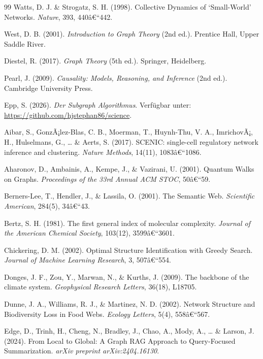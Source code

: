 ﻿\documentclass[12pt,a4paper,twoside]{article}
\theoremstyle{definition}
\theoremstyle{plain}
\theoremstyle{remark}
\begin{document}
\begin{thebibliography}{99}
  Watts, D. J. \& Strogatz, S. H. (1998).
  Collective Dynamics of `Small-World' Networks.
  \textit{Nature}, 393, 440â€“442.

  West, D. B. (2001).
  \textit{Introduction to Graph Theory} (2nd ed.).
  Prentice Hall, Upper Saddle River.

  Diestel, R. (2017).
  \textit{Graph Theory} (5th ed.).
  Springer, Heidelberg.

  Pearl, J. (2009).
  \textit{Causality: Models, Reasoning, and Inference} (2nd ed.).
  Cambridge University Press.


  Epp, S. (2026).
  \textit{Der Subgraph Algorithmus}.
  Verfügbar unter: \url{https://github.com/hjstephan86/science}.

  Aibar, S., GonzÃ¡lez-Blas, C. B., Moerman, T., Huynh-Thu, V. A.,
  ImrichovÃ¡, H., Hulselmans, G., \ldots{} \& Aerts, S. (2017).
  SCENIC: single-cell regulatory network inference and clustering.
  \textit{Nature Methods}, 14(11), 1083â€“1086.

  Aharonov, D., Ambainis, A., Kempe, J., \& Vazirani, U. (2001).
  Quantum Walks on Graphs.
  \textit{Proceedings of the 33rd Annual ACM STOC}, 50â€“59.

  Berners-Lee, T., Hendler, J., \& Lassila, O. (2001).
  The Semantic Web.
  \textit{Scientific American}, 284(5), 34â€“43.

  Bertz, S. H. (1981).
  The first general index of molecular complexity.
  \textit{Journal of the American Chemical Society}, 103(12), 3599â€“3601.

  Chickering, D. M. (2002).
  Optimal Structure Identification with Greedy Search.
  \textit{Journal of Machine Learning Research}, 3, 507â€“554.

  Donges, J. F., Zou, Y., Marwan, N., \& Kurths, J. (2009).
  The backbone of the climate system.
  \textit{Geophysical Research Letters}, 36(18), L18705.

  Dunne, J. A., Williams, R. J., \& Martinez, N. D. (2002).
  Network Structure and Biodiversity Loss in Food Webs.
  \textit{Ecology Letters}, 5(4), 558â€“567.

  Edge, D., Trinh, H., Cheng, N., Bradley, J., Chao, A.,
  Mody, A., \ldots{} \& Larson, J. (2024).
  From Local to Global: A Graph RAG Approach to
  Query-Focused Summarization.
  \textit{arXiv preprint arXiv:2404.16130}.


\end{thebibliography}
\end{document}
